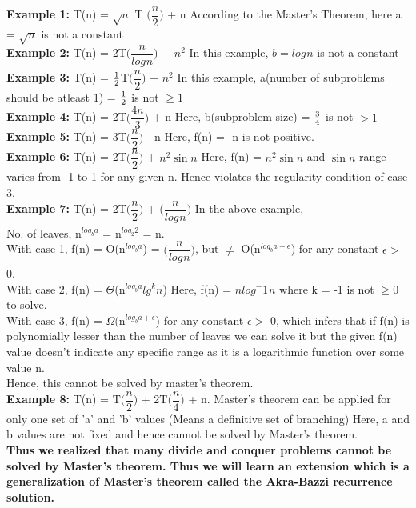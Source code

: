 \documentclass[11pt]{article}
\begin{document}
{\bf Example 1:} T(n) = $\sqrt{n}$ T $\biggl(\dfrac{n}{2}\biggr)$ + n 
According to the Master's Theorem, here a = $\sqrt{n}$ is not a constant \\
{\bf Example 2:} T(n) = 2T$\biggl(\dfrac{n}{log_{}n}\biggr)$ + ${n^{2}}$
In this example, $b = log_{}n$ is not a constant\\
{\bf Example 3:} T(n) = ${{1} \over  {2}}$T$\biggl(\dfrac{n}{2}\biggr)$ + ${n^{2}}$
In this example, a(number of subproblems should be atleast 1) = ${{1} \over  {2}}$ is not $ \geq 1 $ \\
{\bf Example 4:} T(n) = 2T$\biggl(\dfrac{4n}{3}\biggr)$ + n
Here, b(subproblem size) = ${{3} \over  {4}}$ is not $ > 1$ \\
{\bf Example 5:} T(n) = 3T$\biggl(\dfrac{n}{2}\biggr)$ - n
Here, f(n) = -n is not positive. \\ 
{\bf Example 6:} T(n) = 2T$\biggl(\dfrac{n}{2}\biggr)$ + $n^2 \sin n$
Here, f(n) = $n^2 \sin n$ and $\sin n $ range varies from -1 to 1 for any given n. Hence violates the regularity condition of case 3. \\
{\bf Example 7:} T(n) = 2T$\biggl(\dfrac{n}{2}\biggr)$ + $\biggl(\dfrac{n}{log_{}n}\biggr)$
In the above example, \\
No. of leaves, n$^{log_{b}a}$ = n$^{log_{2}2}$ = n.\\
With case 1, f(n) = O(n$^{log_{b}a}$) = $\biggl(\dfrac{n}{log_{}n}\biggr)$, but $ \neq $ O(n$^{log_{b}a-\epsilon}$) for any constant $\epsilon >$ 0. \\
With case 2, f(n) = $\Theta$(n$^{log_{b}a} lg^{k} n $)  Here, f(n) = $n{log^-{1}_{}n}$ where k = -1 is not $\geq 0$ to solve. \\
With case 3, f(n) = $\Omega($n$^{log_{b}a+\epsilon}$) for any constant $\epsilon >$ 0, which infers that if f(n) is polynomially lesser than the number of leaves we can solve it but the given f(n) value doesn't indicate any specific range as it is a logarithmic function over some value n.\\
Hence, this cannot be solved by master's theorem.\\
{\bf Example 8:} T(n) = T$\biggl(\dfrac{n}{2}\biggr)$ + 2T$\biggl(\dfrac{n}{4}\biggr)$ + n.
Master's theorem can be applied for only one set of 'a' and 'b' values (Means a definitive set of branching)
Here, a and b values are not fixed and hence cannot be solved by Master's theorem.\\



{\bf Thus we realized that many divide and conquer problems cannot be solved by Master's theorem. Thus we will learn an extension which is a generalization of Master's theorem called the Akra-Bazzi recurrence solution.}\\
\end{document}
